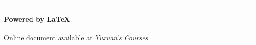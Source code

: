 \vfill
\noindent\rule{\textwidth}{0.1pt}
\vspace{-30pt}
\paragraph*{Powered by \LaTeX}
\hfill Online document available at \textit{\href{https://courses.yuxuanzhang.net}{Yuxuan's Courses}}